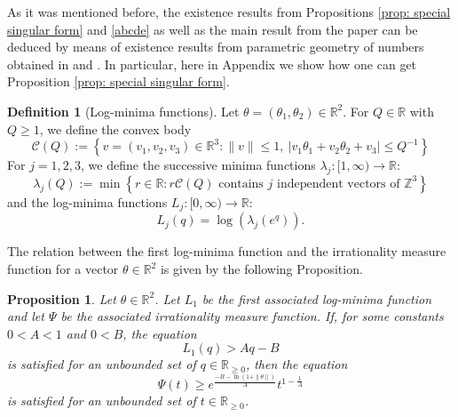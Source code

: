 \documentclass[reqno,11pt, twoside]{amsart}
\theoremstyle{plain}
\newtheorem{prop}[thm]{Proposition}
\theoremstyle{definition}
\newtheorem{defn}[thm]{Definition}
\theoremstyle{definition}
\theoremstyle{remark}
\numberwithin{equation}{section}
\newcommand{\R}{{\mathbb{R}}}
\newcommand{\Z}{{\mathbb{Z}}}
\begin{document}
As it was mentioned before, the existence results from Propositions \ref{prop: special singular form} and \ref{abcde} as well as the main result from the paper 
\cite{LRSY}  can be deduced by means of existence results from parametric geometry of numbers  obtained in \cite{Roy-MathZ} and \cite{DFSU}.
In particular, here in Appendix we  show how one can get Proposition \ref{prop: special singular form}.

 \begin{defn}[Log-minima functions]\label{defn: log minima}
     Let $\theta = (\theta_1, \theta_2) \in \R^2$. For $Q \in \R$ with $Q \geq 1$, we define the convex body
     \begin{equation*}
         \mathcal{C}(Q) := \left\lbrace v=(v_1, v_2, v_3) \in \R^3: \|v\| \leq 1,\ |v_1\theta_1 + v_2 \theta_2 + v_3| \leq Q^{-1}\right\rbrace
     \end{equation*} 
     For $j=1,2,3$, we define the successive minima functions $\lambda_j:[1,\infty) \to \R$:
     \begin{equation*}
         \lambda_j(Q) := \min\left\lbrace r\in \R: r\mathcal{C}(Q) \text{ contains $j$ independent vectors of $\Z^3$}\right\rbrace
     \end{equation*}
     and the log-minima functions $L_j: [0,\infty) \to \R$:
     \begin{equation*}
         L_j(q) = \log (\lambda_j(e^q)).
     \end{equation*}
 \end{defn}
The relation between the first log-minima function and the irrationality measure function for a vector $\theta \in \R^2$ is given by the following Proposition.
\begin{prop}\label{prop: L1 > unbounded}
    Let $\theta \in \R^2$. Let $L_1$ be the first associated log-minima function and let $\Psi$ be the associated irrationality measure function.
    If, for some constants $0 < A < 1$ and $0 < B$, the equation
    \begin{equation}\label{eq: Aq - B}
        L_1(q) > Aq - B
    \end{equation}
    is satisfied for an unbounded set of  $q \in \R_{\geq 0}$,
    then the equation
    \begin{equation*}
        \Psi(t) \geq e^{\frac{-B - \ln(1 + \|\theta\|)}{A}}t^{1 - \frac{1}{A}}
    \end{equation*}
    is satisfied for an unbounded set of  $t \in \R_{\geq 0}$.
\end{prop}
\end{document}
